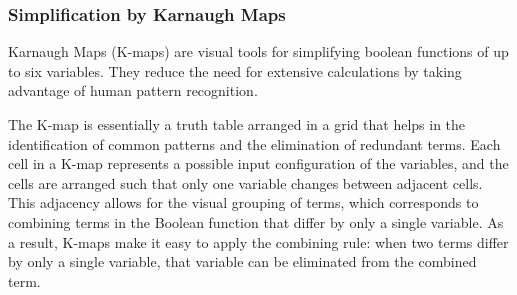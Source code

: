	\subsubsection{Simplification by Karnaugh Maps}
	Karnaugh Maps (K-maps) are visual tools for simplifying boolean functions of up to six variables. They reduce the need for extensive calculations by taking advantage of human pattern recognition. 
	
	The K-map is essentially a truth table arranged in a grid that helps in the identification of common patterns and the elimination of redundant terms. Each cell in a K-map represents a possible input configuration of the variables, and the cells are arranged such that only one variable changes between adjacent cells. This adjacency allows for the visual grouping of terms, which corresponds to combining terms in the Boolean function that differ by only a single variable. As a result, K-maps make it easy to apply the combining rule: when two terms differ by only a single variable, that variable can be eliminated from the combined term.
	
